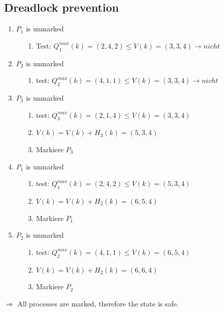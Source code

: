 \documentclass[a4paper, 11pt]{article}
\begin{document}
        \subsection{Dreadlock prevention}
        \label{sec:bank_alg}
        \begin{enumerate}
            \item $P_1$ is unmarked
            \begin{enumerate}
                \item[1.] Test: $Q_1^{max}(k) = (2,4,2) \leq V(k) = (3,3,4) \rightarrow nicht$ 
            \end{enumerate}
            \item $P_2$ is unmarked
            \begin{enumerate}
                \item[1.] test: $Q_2^{max}(k) = (4,1,1) \leq V(k) = (3,3,4) \rightarrow nicht$ 
            \end{enumerate}
            \item $P_3$ is unmarked
            \begin{enumerate}
                \item[1.] test: $Q_3^{max}(k) = (2,1,4) \leq V(k) = (3,3,4)$
                \item[2.] $V(k) = V(k) + H_3(k) = (5,3,4)$
                \item[3.] Markiere $P_3$ 
            \end{enumerate}
            \item $P_1$ is unmarked
            \begin{enumerate}
                \item[1.] test: $Q_1^{max}(k) = (2,4,2) \leq V(k) = (5,3,4)$
                \item[2.] $V(k) = V(k) + H_2(k) = (6,5,4)$
                \item[3.] Markiere $P_1$ 
            \end{enumerate}
            \item $P_2$ is unmarked
            \begin{enumerate}
                \item[1.] test: $Q_2^{max}(k) = (4,1,1) \leq V(k) = (6,5,4)$
                \item[2.] $V(k) = V(k) + H_2(k) = (6,6,4)$
                \item[3.] Markiere $P_2$ 
            \end{enumerate}
      \end{enumerate}
      $\Rightarrow$ All processes are marked, therefore the state is safe.
      \newpage
\end{document}
